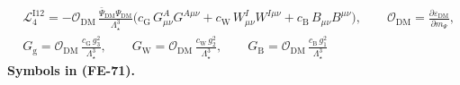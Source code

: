 \documentclass[
  10pt,
]{article}
\begin{document}
\[
\begin{aligned}
&\mathcal{L}_4^{\mathrm{I12}} =
 -\mathcal{O}_{\mathrm{DM}}\,\frac{\bar\Psi_{\mathrm{DM}}\Psi_{\mathrm{DM}}}{\Lambda_\star^3}
 \big(c_{\mathrm{G}}\,G^A_{\mu\nu}G^{A\mu\nu} + c_{\mathrm{W}}\,W^I_{\mu\nu}W^{I\mu\nu} +
 c_{\mathrm{B}}\,B_{\mu\nu}B^{\mu\nu}\big),\qquad
 \mathcal{O}_{\mathrm{DM}} = \frac{\partial\varepsilon_{\mathrm{DM}}}{\partial m_\Psi},\\
&G_{\mathrm{g}} = \mathcal{O}_{\mathrm{DM}}\,\frac{c_{\mathrm{G}}\,g_3^2}{\Lambda_\star^3},\qquad
 G_{\mathrm{W}} = \mathcal{O}_{\mathrm{DM}}\,\frac{c_{\mathrm{W}}\,g_2^2}{\Lambda_\star^3},\qquad
 G_{\mathrm{B}} = \mathcal{O}_{\mathrm{DM}}\,\frac{c_{\mathrm{B}}\,g_1^2}{\Lambda_\star^3}
\end{aligned} \tag{FE-71}
\] \textbf{Symbols in (FE-71).}
\end{document}
